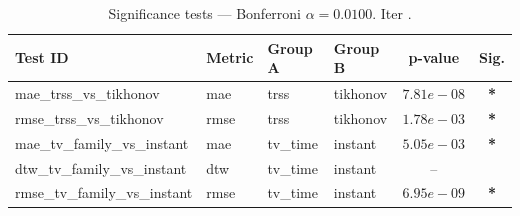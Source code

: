 ﻿%
\begin{table}[ht]
\centering
\caption[EEG reconstruction - Iteration it32]{Significance tests — Bonferroni $\alpha=0.0100$. Iter .}
\label{tab:sig_it32_3syn_mr20_only}
\small
\begin{tabular}{llllcc}
\toprule
Test ID & Metric & Group A & Group B & p-value & Sig. \\
\midrule
mae\_trss\_vs\_tikhonov & mae & trss & tikhonov & $7.81e-08$ & \textbf{*} \\
rmse\_trss\_vs\_tikhonov & rmse & trss & tikhonov & $1.78e-03$ & \textbf{*} \\
mae\_tv\_family\_vs\_instant & mae & tv\_time & instant & $5.05e-03$ & \textbf{*} \\
dtw\_tv\_family\_vs\_instant & dtw & tv\_time & instant & -- &  \\
rmse\_tv\_family\_vs\_instant & rmse & tv\_time & instant & $6.95e-09$ & \textbf{*} \\
\bottomrule
\end{tabular}
\end{table}








